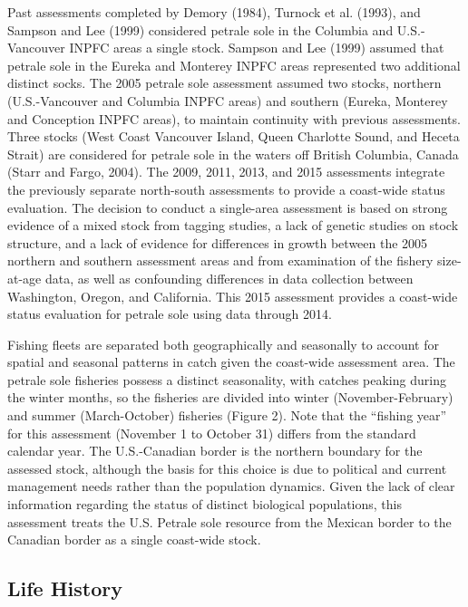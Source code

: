 \documentclass[12pt,]{article}
\begin{document}
Past assessments completed by Demory (1984), Turnock et al. (1993), and
Sampson and Lee (1999) considered petrale sole in the Columbia and
U.S.-Vancouver INPFC areas a single stock. Sampson and Lee (1999)
assumed that petrale sole in the Eureka and Monterey INPFC areas
represented two additional distinct socks. The 2005 petrale sole
assessment assumed two stocks, northern (U.S.-Vancouver and Columbia
INPFC areas) and southern (Eureka, Monterey and Conception INPFC areas),
to maintain continuity with previous assessments. Three stocks (West
Coast Vancouver Island, Queen Charlotte Sound, and Heceta Strait) are
considered for petrale sole in the waters off British Columbia, Canada
(Starr and Fargo, 2004). The 2009, 2011, 2013, and 2015 assessments
integrate the previously separate north-south assessments to provide a
coast-wide status evaluation. The decision to conduct a single-area
assessment is based on strong evidence of a mixed stock from tagging
studies, a lack of genetic studies on stock structure, and a lack of
evidence for differences in growth between the 2005 northern and
southern assessment areas and from examination of the fishery
size-at-age data, as well as confounding differences in data collection
between Washington, Oregon, and California. This 2015 assessment
provides a coast-wide status evaluation for petrale sole using data
through 2014.

Fishing fleets are separated both geographically and seasonally to
account for spatial and seasonal patterns in catch given the coast-wide
assessment area. The petrale sole fisheries possess a distinct
seasonality, with catches peaking during the winter months, so the
fisheries are divided into winter (November-February) and summer
(March-October) fisheries (Figure 2). Note that the ``fishing year'' for
this assessment (November 1 to October 31) differs from the standard
calendar year. The U.S.-Canadian border is the northern boundary for the
assessed stock, although the basis for this choice is due to political
and current management needs rather than the population dynamics. Given
the lack of clear information regarding the status of distinct
biological populations, this assessment treats the U.S. Petrale sole
resource from the Mexican border to the Canadian border as a single
coast-wide stock.

\subsection{Life History}\label{life-history}
\end{document}
